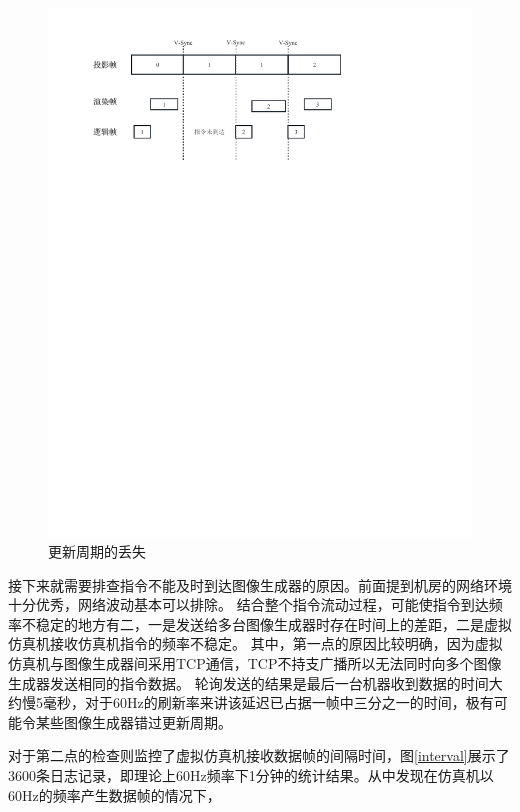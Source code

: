 \begin{figure}[h!]
    \begin{center}
        \includegraphics[width=\textwidth]{pictures/tearreason.pdf}
        \caption{更新周期的丢失}
        \label{tearreason}
    \end{center}
\end{figure}
\par 
接下来就需要排查指令不能及时到达图像生成器的原因。前面提到机房的网络环境十分优秀，网络波动基本可以排除。
结合整个指令流动过程，可能使指令到达频率不稳定的地方有二，一是发送给多台图像生成器时存在时间上的差距，二是虚拟仿真机接收仿真机指令的频率不稳定。
其中，第一点的原因比较明确，因为虚拟仿真机与图像生成器间采用TCP通信，TCP不持支广播所以无法同时向多个图像生成器发送相同的指令数据。
轮询发送的结果是最后一台机器收到数据的时间大约慢5毫秒，对于60Hz的刷新率来讲该延迟已占据一帧中三分之一的时间，极有可能令某些图像生成器错过更新周期。
\par
对于第二点的检查则监控了虚拟仿真机接收数据帧的间隔时间，图\ref{interval}展示了3600条日志记录，即理论上60Hz频率下1分钟的统计结果。从中发现在仿真机以60Hz的频率产生数据帧的情况下，
